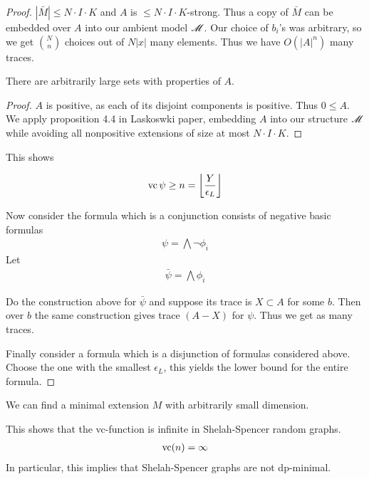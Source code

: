 \begin{proof}
  $|\bar M| \leq N \cdot I \cdot K$ and $A$ is $\leq N \cdot I \cdot K$-strong.
  Thus a copy of $\bar M$ can be embedded over $A$ into our ambient model $\mathscr M$.
  Our choice of $b_i$'s was arbitrary, so we get ${N \choose n}$ choices out of $N|x|$ many elements.
  Thus we have $O(|A|^n)$ many traces.

  \begin{Lemma}
    There are arbitrarily large sets with properties of $A$.
  \end{Lemma}
  
  \begin{proof}
    $A$ is positive, as each of its disjoint components is positive. Thus $0 \leq A$.
    We apply proposition 4.4 in Laskoswki paper, embedding $A$ into our structure $\mathscr M$ while avoiding all nonpositive extensions of size at most $N \cdot I \cdot K$.
  \end{proof}

  This shows

  \begin{align*}
    \operatorname{vc} \psi \geq n = \left \lfloor \frac{Y}{\epsilon_L} \right \rfloor
  \end{align*}

  Now consider the formula which is a conjunction consists of negative basic formulas
  \begin{align*}
    \psi = \bigwedge \neg \phi_i
  \end{align*}
  Let
  \begin{align*}
    \bar \psi = \bigwedge \phi_i
  \end{align*}

  Do the construction above for $\bar \psi$ and suppose its trace is $X \subset A$ for some $b$.
  Then over $b$ the same construction gives trace $(A - X)$ for $\psi$. Thus we get as many traces.
  
  Finally consider a formula which is a disjunction of formulas considered above.
  Choose the one with the smallest $\epsilon_L$, this yields the lower bound for the entire formula.
\end{proof}

\begin{Claim}
  We can find a minimal extension $M$ with arbitrarily small dimension.
\end{Claim}

\begin{Corollary}
  This shows that the vc-function is infinite in Shelah-Spencer random graphs.
  \begin{align*}
    \operatorname{vc}(n) = \infty
  \end{align*}
  In particular, this implies that Shelah-Spencer graphs are not dp-minimal.
\end{Corollary}

